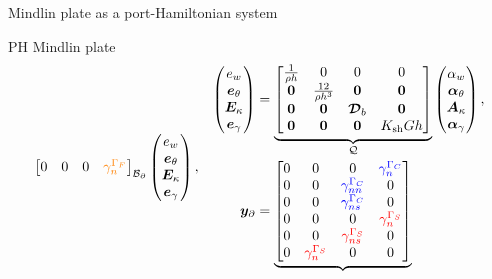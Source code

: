 \documentclass[aspectratio=169]{ISAE-Beamer}
\begin{document}
\begin{frame}{Mindlin plate as a port-Hamiltonian system}
\begin{block}{PH Mindlin plate}
\begin{equation*}
\begin{aligned}
{\begin{bmatrix}
			{0} &  {0} & {0} & \textcolor{orange}{\gamma_{n}^{\Gamma_F}} \\
			\end{bmatrix}}_{\mathcal{B}_\partial} \begin{pmatrix}
		e_w \\
		\bm{e}_{\theta} \\
		\bm{E}_{\kappa} \\
		\bm{e}_{\gamma} \\
		\end{pmatrix}, 
		\end{aligned} \quad
		\begin{aligned}
		\begin{pmatrix}
		e_w \\
		\bm{e}_{\theta} \\
		\bm{E}_{\kappa} \\
		\bm{e}_{\gamma} \\
		\end{pmatrix} &= 
		\underbrace{\begin{bmatrix}
			\frac{1}{\rho h}  & 0 & 0  & 0 \\
			\bm{0} & \frac{12}{\rho h^3} &  \bm{0} & \bm{0}\\
			\bm{0} & \bm{0} & \bm{\mathcal{D}}_b  & \bm{0}\\
			\bm{0} & \bm{0} &  \bm{0} & K_{\text{sh}} G h \\
			\end{bmatrix}}_{\mathcal{Q}}
		\begin{pmatrix}
		\alpha_w \\
		\bm\alpha_\theta \\
		\bm{A}_\kappa \\
		\bm\alpha_{\gamma} \\
		\end{pmatrix}, \\
		\bm{y}_\partial &= \underbrace{
			\begin{bmatrix}
			{0} & {0} & {0} & \textcolor{blue}{\gamma_{n}^{\Gamma_C}} \\
			{0} & {0} & \textcolor{blue}{\gamma_{nn}^{\Gamma_C}} & {0} \\
			{0} & {0} & \textcolor{blue}{\gamma_{ns}^{\Gamma_C}} & {0} \\
			{0} & {0} & {0} & \textcolor{red}{\gamma_{n}^{\Gamma_S}} \\
			{0} & {0} & \textcolor{red}{\gamma_{ns}^{\Gamma_S}} & {0} \\
			{0} & \textcolor{red}{\gamma_{n}^{\Gamma_S}} & {0} & {0} \\

\end{bmatrix}}
\end{aligned}
\end{equation*}
\end{block}
\end{frame}
\end{document}
